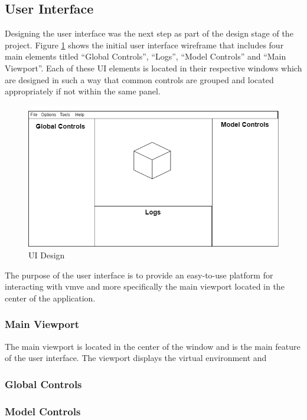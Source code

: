 \documentclass[11pt]{article}
\begin{document}
\subsection{User Interface}
Designing the user interface was the next step as part of the design stage of
the project. Figure \ref{fig:ui_design} shows the initial user interface
wireframe that includes four main elements titled ``Global Controls'', ``Logs'',
``Model Controls'' and ``Main Viewport''. Each of these UI elements is located
in their respective windows which are designed in such a way that common
controls are grouped and located appropriately if not within the same panel.

\begin{figure}[H]
  \centering
  \includegraphics[width=\textwidth]{images/ui_design.png}
  \caption{UI Design}
  \label{fig:ui_design}
\end{figure}

The purpose of the user interface is to provide an easy-to-use platform for
interacting with \gls*{vmve} and more specifically the main viewport located in
the center of the application.

\subsubsection{Main Viewport}
The main viewport is located in the center of the window and is the main feature
of the user interface. The viewport displays the virtual environment and 

\subsubsection{Global Controls}

\subsubsection{Model Controls}
\end{document}
